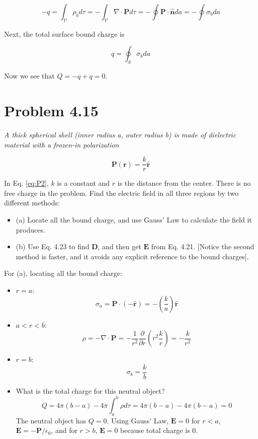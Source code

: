 \documentclass[10pt]{article}
\begin{document}
\begin{equation}
-q = \int_{\mathcal{V}} \rho_b d\tau = -\int_{\mathcal{V}} \nabla \cdot \mathbf{P} d\tau = -\oint \mathbf{P} \cdot \hat{\mathbf{n}} da = -\oint \sigma_b da
\end{equation}

Next, the total surface bound charge is

\begin{equation}
q = \oint_S \sigma_b da
\end{equation}

Now we see that $Q = -q + q = 0$.

\section{Problem 4.15}

\textit{A thick spherical shell (inner radius a, outer radius b) is made of dielectric material with a frozen-in polarization}

\begin{equation}
\mathbf{P}(\mathbf{r}) = \frac{k}{r}\hat{\mathbf{r}} \label{eq:P2}
\end{equation}

In Eq. \ref{eq:P2}, $k$ is a constant and $r$ is the distance from the center.  There is no free charge in the problem.  Find the electric field in all three regions by two different methods:
\begin{itemize}
\item (a) Locate all the bound charge, and use Gauss' Law to calculate the field it produces.
\item (b) Use Eq. 4.23 to find $\mathbf{D}$, and then get $\mathbf{E}$ from Eq. 4.21. [Notice the second method is faster, and it avoids any explicit reference to the bound charges].
\end{itemize}

For (a), locating all the bound charge:

\begin{itemize}
\item $r = a$: 
\begin{equation}
\sigma_a = \mathbf{P} \cdot (- \hat{\mathbf{r}}) = -\left(\frac{k}{a}\right)\hat{\mathbf{r}}
\end{equation}
\item $a < r < b$:
\begin{equation}
\rho = -\nabla \cdot \mathbf{P} = -\frac{1}{r^2} \frac{\partial}{\partial r}\left(r^2 \frac{k}{r}\right) = -\frac{k}{r^2}
\end{equation}
\item $r = b$:
\begin{equation}
\sigma_b = \frac{k}{b}
\end{equation}
\item What is the total charge for this neutral object? 
\begin{equation}
Q = 4\pi(b - a) - 4\pi \int_a^b \rho d\tau = 4\pi(b-a) - 4\pi(b-a) = 0
\end{equation}
The neutral object has $Q = 0$.  Using Gauss' Law, $\mathbf{E} = 0$ for $r < a$, $\mathbf{E} = -\mathbf{P}/\epsilon_0$, and for $r > b$, $\mathbf{E} = 0$ because total charge is 0.
\end{itemize}
\end{document}
